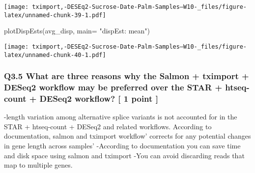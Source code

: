 \documentclass[
]{article}
\newenvironment{Shaded}{\begin{snugshade}}{\end{snugshade}}
\newcommand{\AttributeTok}[1]{\textcolor[rgb]{0.77,0.63,0.00}{#1}}
\newcommand{\FunctionTok}[1]{\textcolor[rgb]{0.00,0.00,0.00}{#1}}
\newcommand{\NormalTok}[1]{#1}
\newcommand{\StringTok}[1]{\textcolor[rgb]{0.31,0.60,0.02}{#1}}
\begin{document}
\texttt{[image: tximport,-DESEq2-Sucrose-Date-Palm-Samples--W10-\_files/figure-latex/unnamed-chunk-39-1.pdf]}

\begin{Shaded}
\begin{Highlighting}[]
\FunctionTok{plotDispEsts}\NormalTok{(avg\_disp, }\AttributeTok{main=} \StringTok{"dispEst: mean"}\NormalTok{)}
\end{Highlighting}
\end{Shaded}

\texttt{[image: tximport,-DESEq2-Sucrose-Date-Palm-Samples--W10-\_files/figure-latex/unnamed-chunk-40-1.pdf]}

\hypertarget{q3.5-what-are-three-reasons-why-the-salmon-tximport-deseq2-workflow-may-be-preferred-over-the-star-htseq-count-deseq2-workflow-1-point}{%
\subsubsection{Q3.5 What are three reasons why the Salmon + tximport +
DESeq2 workflow may be preferred over the STAR + htseq-count + DESeq2
workflow? {[} 1 point
{]}}\label{q3.5-what-are-three-reasons-why-the-salmon-tximport-deseq2-workflow-may-be-preferred-over-the-star-htseq-count-deseq2-workflow-1-point}}

-length variation among alternative splice variants is not accounted for
in the STAR + htseq-count + DESeq2 and related workflows. According to
documentation, salmon and tximport workflow' corrects for any potential
changes in gene length across samples' -According to documentation you
can save time and disk space using salmon and tximport -You can avoid
discarding reads that map to multiple genes.
\end{document}
